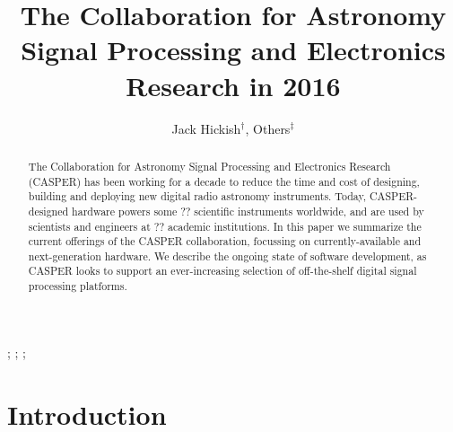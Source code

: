 \documentclass{ws-jai}
\begin{document}
\catchline{}{}{}{}{} %


\title{The Collaboration for Astronomy Signal Processing and Electronics Research in 2016}

\author{Jack Hickish$^\dagger$, Others$^\ddagger$}

\address{
$^\dagger$Radio Astronomy Laboratory, UC Berkeley, Berkeley, CA 94720, USA, jackh@astro.berkeley.edu\\
$^\ddagger$Group, Company, Address, City, State ZIP/Zone, Country\\
$^\S$Group, Company, Address, City, State ZIP/Zone, Country, fauthor@company.com
}

\maketitle


\begin{history}
;
;
;
\end{history}

\begin{abstract}

The Collaboration for Astronomy Signal Processing and Electronics Research
(CASPER) has been working for a decade to reduce the time and cost of designing,
building and deploying new digital radio astronomy instruments.  Today,
CASPER-designed hardware powers some ?? scientific instruments worldwide, and
are used by scientists and engineers at ?? academic institutions.  In this paper
we summarize the current offerings of the CASPER collaboration, focussing on
currently-available and next-generation hardware.  We describe the ongoing state
of software development, as CASPER looks to support an ever-increasing selection
of off-the-shelf digital signal processing platforms.

\end{abstract}


\section{Introduction}
\end{document}
